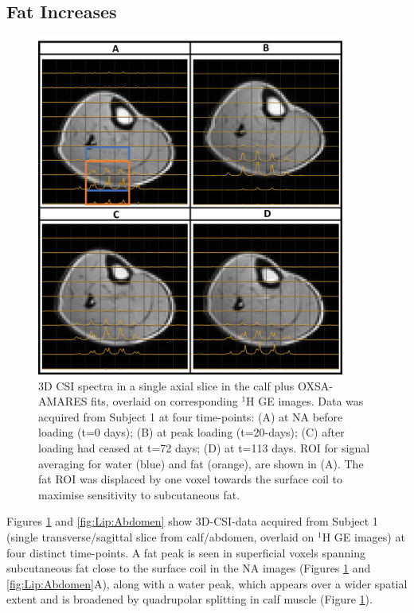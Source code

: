 \documentclass[class=article, crop=false]{standalone}
\begin{document}
\subsection{Fat Increases}

\begin{figure}
    \centering
    \includegraphics[width=0.9\textwidth]{Figures/Lipid/Calf.png}
    \caption{3D CSI spectra in a single axial slice in the calf plus OXSA-AMARES fits, overlaid on corresponding $^1$H GE images. Data was acquired from Subject 1 at four time-points: (A) at NA before loading (t=0 days); (B) at peak loading (t=20-days); (C) after loading had ceased at t=72 days; (D) at t=113 days. ROI for signal averaging for water (blue) and fat (orange), are shown in (A). The fat ROI was displaced by one voxel towards the surface coil to maximise sensitivity to subcutaneous fat.}
    \label{fig:Lip:Calf}
\end{figure}

Figures \ref{fig:Lip:Calf} and \ref{fig:Lip:Abdomen} show 3D-CSI-data acquired from Subject 1 (single transverse/sagittal slice from calf/abdomen, overlaid on $^1$H GE images) at four distinct time-points. A fat peak is seen in superficial voxels spanning subcutaneous fat close to the surface coil in the NA images (Figures \ref{fig:Lip:Calf} and \ref{fig:Lip:Abdomen}A), along with a water peak, which appears over a wider spatial extent and is broadened by quadrupolar splitting in calf muscle (Figure \ref{fig:Lip:Calf}). 
\end{document}

